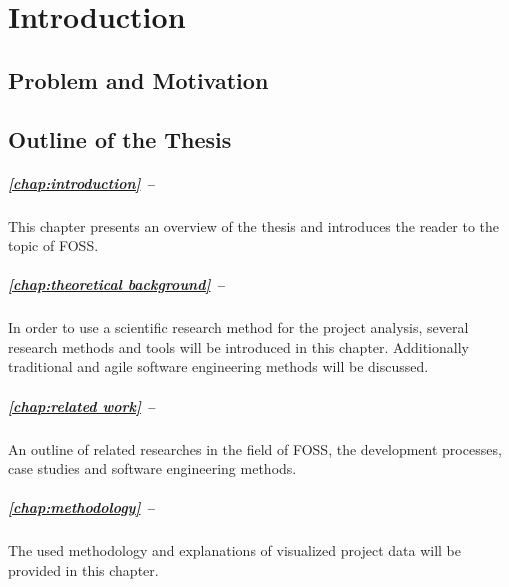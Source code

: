 \chapter{Introduction} %
\label{chap:introduction}

\section{Problem and Motivation} %


\section{Outline of the Thesis} %

\paragraph{\autoref{chap:introduction} -- }

This chapter presents an overview of the thesis and introduces the reader to
the topic of \ac{FOSS}.

\paragraph{\autoref{chap:theoretical background} -- }

In order to use a scientific research method for the project analysis, several
research methods and tools will be introduced in this chapter. Additionally
traditional and agile software engineering methods will be discussed.

\paragraph{\autoref{chap:related work} -- }

An outline of related researches in the field of \ac{FOSS}, the
development processes, case studies and software engineering methods.

\paragraph{\autoref{chap:methodology} -- }

The used methodology and explanations of visualized project data will be
provided in this chapter.

